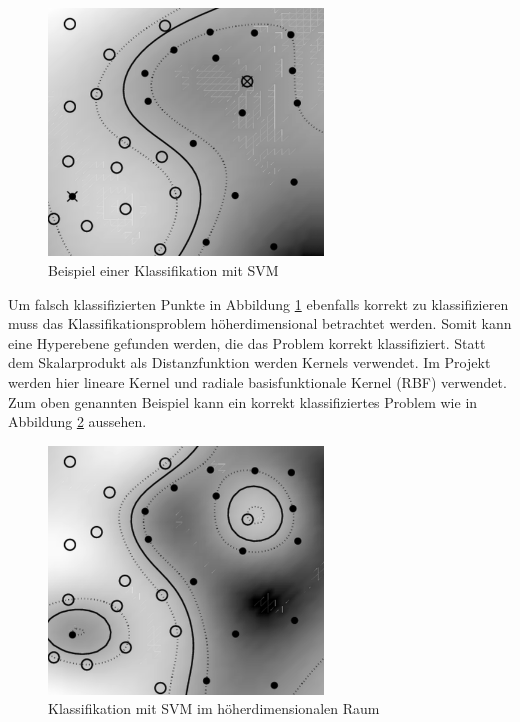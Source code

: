 \begin{figure}[h]
  \centering
  \includegraphics[width=0.65\textwidth]{images/svmA}
  \caption{Beispiel einer Klassifikation mit SVM \cite[S. 217]{bib:svmA}}
  \label{fig:svmA}
\end{figure}

Um falsch klassifizierten Punkte in Abbildung \ref{fig:svmA} ebenfalls korrekt zu klassifizieren muss das Klassifikationsproblem höherdimensional betrachtet werden. Somit kann eine Hyperebene gefunden werden, die das Problem korrekt klassifiziert. Statt dem Skalarprodukt als Distanzfunktion werden Kernels verwendet. Im Projekt werden hier lineare Kernel und radiale basisfunktionale Kernel (RBF) verwendet. Zum oben genannten Beispiel kann ein korrekt klassifiziertes Problem wie in Abbildung \ref{fig:svmB} aussehen.

\begin{figure}[h]
  \centering
  \includegraphics[width=0.65\textwidth]{images/svmB}
  \caption{Klassifikation mit SVM im höherdimensionalen Raum \cite[S. 217]{bib:svmA}}
  \label{fig:svmB}
\end{figure}

